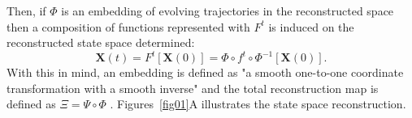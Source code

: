 \documentclass[fleqn,10pt]{wlscirep}
\begin{document}
Then, if $\Phi$ is an embedding of evolving trajectories in the reconstructed space then a composition of functions represented with $F^t$ is induced on the reconstructed state space determined:
\begin{equation}\label{eq:st}
  \boldsymbol{X}(t)=F^t [\boldsymbol{X}(0)] = \Phi \circ f^t \circ \Phi ^{-1}[\boldsymbol{X}(0)].
\end{equation}
With this in mind, an embedding is defined as "a smooth one-to-one coordinate transformation with a smooth inverse" and the total reconstruction map is defined as $ \Xi = \Psi \circ \Phi $ \cite{casdagli1991}.
Figures~\ref{fig01}A illustrates the state space reconstruction.
\end{document}
